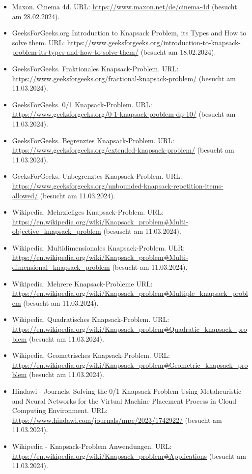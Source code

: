 \begin{itemize}
    \item Maxon. Cinema 4d. URL: \url{https://www.maxon.net/de/cinema-4d} (besucht am 28.02.2024).
    \item GeeksForGeeks.org Introduction to Knapsack Problem, its Types and How to solve them. URL: \url{https://www.geeksforgeeks.org/introduction-to-knapsack-problem-its-types-and-how-to-solve-them/} (besucht am 18.02.2024).
    \item GeeksForGeeks. Fraktionales Knapsack-Problem. URL: \url{https://www.geeksforgeeks.org/fractional-knapsack-problem/} (besucht am 11.03.2024).
    \item GeeksForGeeks. 0/1 Knapsack-Problem. URL: \url{https://www.geeksforgeeks.org/0-1-knapsack-problem-dp-10/} (besucht am 11.03.2024).
    \item GeeksForGeeks. Begrenztes Knapsack-Problem. URL: \url{https://www.geeksforgeeks.org/extended-knapsack-problem/} (besucht am 11.03.2024).
    \item GeeksForGeeks. Unbegrenztes Knapsack-Problem. URL: \url{https://www.geeksforgeeks.org/unbounded-knapsack-repetition-items-allowed/} (besucht am 11.03.2024).
    \item Wikipedia. Mehrzieliges Knapsack-Problem. URL: \url{https://en.wikipedia.org/wiki/Knapsack_problem#Multi-objective_knapsack_problem} (besuscht am 11.03.2024).
    \item Wikipedia. Multidimensionales Knapsack-Problem. ULR: \url{https://en.wikipedia.org/wiki/Knapsack_problem#Multi-dimensional_knapsack_problem} (besucht am 11.03.2024).
    \item Wikipedia. Mehrere Knapsack-Probleme URL: \url{https://en.wikipedia.org/wiki/Knapsack_problem#Multiple_knapsack_problem} (besucht am 11.03.2024).
    \item Wikipedia. Quadratisches Knapsack-Problem. URL: \url{https://en.wikipedia.org/wiki/Knapsack_problem#Quadratic_knapsack_problem} (besucht am 11.03.2024).
    \item Wikipedia. Geometrisches Knapsack-Problem. URL: \url{https://en.wikipedia.org/wiki/Knapsack_problem#Geometric_knapsack_problem} (besucht am 11.03.2024).
    \item Hindawi - Journels. Solving the 0/1 Knapsack Problem Using Metaheuristic and Neural Networks for the Virtual Machine Placement Process in Cloud Computing Environment. URL: \url{https://www.hindawi.com/journals/mpe/2023/1742922/} (besucht am 11.03.2024).
    \item Wikipedia - Knapsack-Problem Anwendungen. URL: \url{https://en.wikipedia.org/wiki/Knapsack_problem#Applications} (besucht am 11.03.2024).

\end{itemize}
